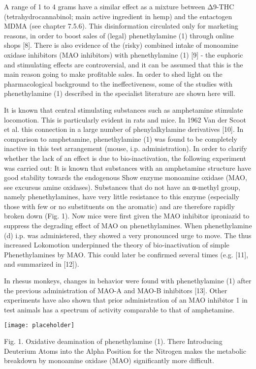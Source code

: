 A range of 1 to 4 grams have a similar effect as a mixture between Δ9-THC (tetrahydrocannabinol; main active ingredient in hemp) and the entactogen MDMA (see chapter 7.5.6). This disinformation circulated only for marketing reasons, in order to boost sales of (legal) phenethylamine (1) through online shops [8]. There is also evidence of the (risky) combined intake of monoamine oxidase inhibitors (MAO inhibitors) with phenethylamine (1) [9] - the euphoric and stimulating effects are controversial, and it can be assumed that this is the main reason going to make profitable sales.
In order to shed light on the pharmacological background to the ineffectiveness, some of the studies with phenethylamine (1) described in the specialist literature are shown here
will.

It is known that central stimulating substances such as amphetamine stimulate locomotion. This is particularly evident in rats and mice. In 1962 Van der Scoot et al. this connection in a large number of phenylalkylamine derivatives [10]. In comparison to amphetamine, phenethylamine (1) was found to be completely inactive in this test arrangement (mouse, i.p. administration). In order to clarify whether the lack of an effect is due to bio-inactivation, the following experiment was carried out: It is known that substances with an amphetamine structure have good stability towards the endogenous
Show enzyme monoamine oxidase (MAO, see excursus amine oxidases). Substances that do not have an α-methyl group, namely phenethylamines, have very little resistance to this enzyme (especially those with few or no substituents on the aromatic) and are therefore rapidly broken down (Fig. 1). Now mice were first given the MAO inhibitor iproniazid to suppress the degrading effect of MAO on phenethylamines. When phenethylamine (d) i.p. was administered, they showed a very pronounced urge to move. The thus increased Lokomotion underpinned the theory of bio-inactivation of simple
Phenethylamines by MAO. This could later be confirmed several times (e.g. [11], and summarized in [12]).

In rhesus monkeys, changes in behavior were found with phenethylamine (1) after the previous administration of MAO-A and MAO-B inhibitors [13].
Other experiments have also shown that prior administration of an MAO inhibitor 1 in test animals has a spectrum of activity comparable to that of amphetamine.


\texttt{[image: placeholder]}

Fig. 1. Oxidative deamination of phenethylamine (1). There
Introducing Deuterium Atoms into the Alpha Position for the
Nitrogen makes the metabolic breakdown by monoamine oxidase (MAO) significantly more difficult.
\clearpage

